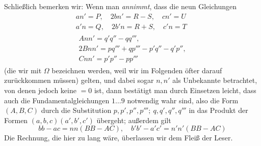 Schließlich bemerken wir: Wenn man \textit{annimmt}, dass die neun Gleichungen
\[
\begin{gathered}
an'=P,\quad 2bn'=R-S,\quad cn'=U\\
a'n=Q,\quad 2b'n=R+S,\quad c'n=T\\
\begin{gathered}Ann'=q'q''-qq''',\\2Bnn'=pq'''+qp'''-p'q''-q'p'',\\Cnn'=p'p''-pp'''\end{gathered}
\end{gathered}
\]
(die wir mit $\Omega$ bezeichnen werden, weil wir im Folgenden öfter darauf zurückkommen müssen) gelten, und dabei sogar $n,n'$ als Unbekannte betrachtet, von denen jedoch keine $=0$ ist, dann bestätigt man durch Einsetzen leicht, dass auch die Fundamentalgleichungen $1\ldots9$ notwendig wahr sind, also die Form $(A,B,C)$ durch die Substitution $p,p',p'',p''';\ q,q',q'',q'''$ in das Produkt der Formen $(a,b,c)(a',b',c')$ übergeht; außerdem gilt
\[
bb-ac=nn(BB-AC),\quad b'b'-a'c'=n'n'(BB-AC)
\]
Die Rechnung, die hier zu lang wäre, überlassen wir dem Fleiß der Leser.
